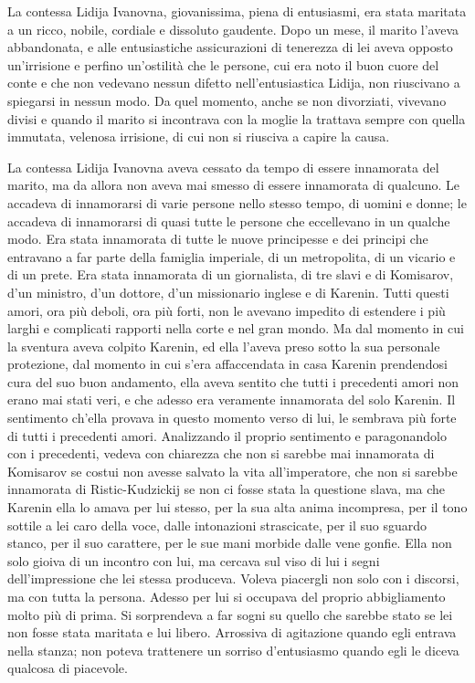 La contessa Lidija Ivanovna, giovanissima, piena di entusiasmi, era stata maritata a un ricco, nobile, cordiale e dissoluto gaudente. Dopo un mese, il marito l'aveva abbandonata, e alle entusiastiche assicurazioni di tenerezza di lei aveva opposto un'irrisione e perfino un'ostilità che le persone, cui era noto il buon cuore del conte e che non vedevano nessun difetto nell'entusiastica Lidija, non riuscivano a spiegarsi in nessun modo. Da quel momento, anche se non divorziati, vivevano divisi e quando il marito si incontrava con la moglie la trattava sempre con quella immutata, velenosa irrisione, di cui non si riusciva a capire la causa. 
\enlargethispage*{1\baselineskip}

La contessa Lidija Ivanovna aveva cessato da tempo di essere innamorata del marito, ma da allora non aveva mai smesso di essere innamorata di qualcuno. Le accadeva di innamorarsi di varie persone nello stesso tempo, di uomini e donne; le accadeva di innamorarsi di quasi tutte le persone che eccellevano in un qualche modo. Era stata innamorata di tutte le nuove principesse e dei principi che entravano a far parte della famiglia imperiale, di un metropolita, di un vicario e di un prete. Era stata innamorata di un giornalista, di tre slavi e di Komisarov, d'un ministro, d'un dottore, d'un missionario inglese e di Karenin. Tutti questi amori, ora più deboli, ora più forti, non le avevano impedito di estendere i più larghi e complicati rapporti nella corte e nel gran mondo. Ma dal momento in cui la sventura aveva colpito Karenin, ed ella l'aveva preso sotto la sua personale protezione, dal momento in cui s'era affaccendata in casa Karenin prendendosi cura del suo buon andamento, ella aveva sentito che tutti i precedenti amori non erano mai stati veri, e che adesso era veramente innamorata del solo Karenin. Il sentimento ch'ella provava in questo momento verso di lui, le sembrava più forte di tutti i precedenti amori. Analizzando il proprio sentimento e paragonandolo con i precedenti, vedeva con chiarezza che non si sarebbe mai innamorata di Komisarov se costui non avesse salvato la vita all'imperatore, che non si sarebbe innamorata di Ristic-Kudzickij se non ci fosse stata la questione slava, ma che Karenin ella lo amava per lui stesso, per la sua alta anima incompresa, per il tono sottile a lei caro della voce, dalle intonazioni strascicate, per il suo sguardo stanco, per il suo carattere, per le sue mani morbide dalle vene gonfie. Ella non solo gioiva di un incontro con lui, ma cercava sul viso di lui i segni dell'impressione che lei stessa produceva. Voleva piacergli non solo con i discorsi, ma con tutta la persona. Adesso per lui si occupava del proprio abbigliamento molto più di prima. Si sorprendeva a far sogni su quello che sarebbe stato se lei non fosse stata maritata e lui libero. Arrossiva di agitazione quando egli entrava nella stanza; non poteva trattenere un sorriso d'entusiasmo quando egli le diceva qualcosa di piacevole. 

